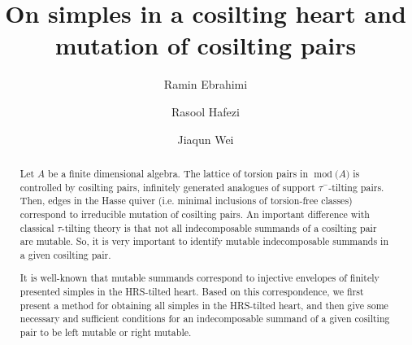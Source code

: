 \documentclass[12pt]{amsart}
\numberwithin{equation}{section}
\theoremstyle{definition}
\DeclareMathOperator{\modd}{mod}
\newtheorem*{theorem 0*}{Theorem}
\newtheorem*{theorem a*}{Theorem A}
\newtheorem*{theorem b*}{Theorem B}
\numberwithin{diagram}{section}
\begin{document}
	
	\title{On simples in a cosilting heart and mutation of cosilting pairs}
	\author{Ramin Ebrahimi} 
\address{School of Mathematical Sciences, Zhejiang Normal University, Jinhua 321004, China}
\author{Rasool Hafezi}
\address{School of Mathematics and Statistics, Nanjing University of Information Science and Technology, Nanjing, Jiangsu 210044, P.R. China}
\author{Jiaqun Wei}
\address{School of Mathematical Science, Zhejiang Normal University, Jinhua 321004, China}
	
	
	
	
	
	
	\begin{abstract}
Let $A$ be a finite dimensional algebra. The lattice of torsion pairs in $\modd\text{(}A\text{)}$ is controlled by cosilting pairs, infinitely generated analogues of support $\tau^-$-tilting pairs. Then, edges in the Hasse quiver (i.e. minimal inclusions of torsion-free classes) correspond to irreducible mutation of cosilting pairs. An important difference with classical $\tau$-tilting theory is that not all indecomposable summands of a cosilting pair are mutable.
So, it is very important to identify mutable indecomposable summands in a given cosilting pair.

It is well-known that mutable summands correspond to injective envelopes of finitely presented simples in the HRS-tilted heart. Based on this correspondence, we first present a method for obtaining all simples in the HRS-tilted heart, and then give some necessary and sufficient conditions for an indecomposable summand of a given cosilting pair to be left mutable or right mutable.
	\end{abstract}
	
	\maketitle
	
	
	
	
	
\end{document}
